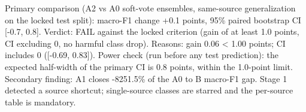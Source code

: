 Primary comparison (A2 vs A0 soft-vote ensembles, same-source generalization on the locked test split): macro-F1 change +0.1 points, 95\% paired bootstrap CI [-0.7, 0.8]. Verdict: FAIL against the locked criterion (gain of at least 1.0 points, CI excluding 0, no harmful class drop). Reasons: gain 0.06 < 1.00 points; CI includes 0 ([-0.69, 0.83]). Power check (run before any test prediction): the expected half-width of the primary CI is 0.8 points, within the 1.0-point limit. Secondary finding: A1 closes -8251.5\% of the A0 to B macro-F1 gap. Stage 1 detected a source shortcut; single-source classes are starred and the per-source table is mandatory.
